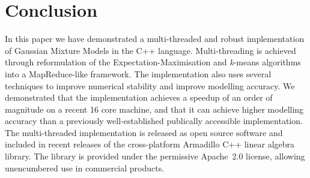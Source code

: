 \section{Conclusion}


In this paper we have demonstrated a multi-threaded and robust implementation
of Gaussian Mixture Models in the C++ language.
Multi-threading is achieved through reformulation of the Expectation-Maximisation and {\it k}-means algorithms into a MapReduce-like framework.
The implementation also uses several techniques to improve numerical stability and improve modelling accuracy.
We demonstrated that the implementation achieves a speedup of an order of magnitude on a recent 16 core machine,
and that it can achieve higher modelling accuracy than a previously well-established publically accessible implementation.
The multi-threaded implementation is \mbox{released} as open source software
and included in recent releases of the cross-platform Armadillo C++ linear algebra library.
The library is provided under the permissive Apache~2.0 license, allowing unencumbered use in commercial products.
  
